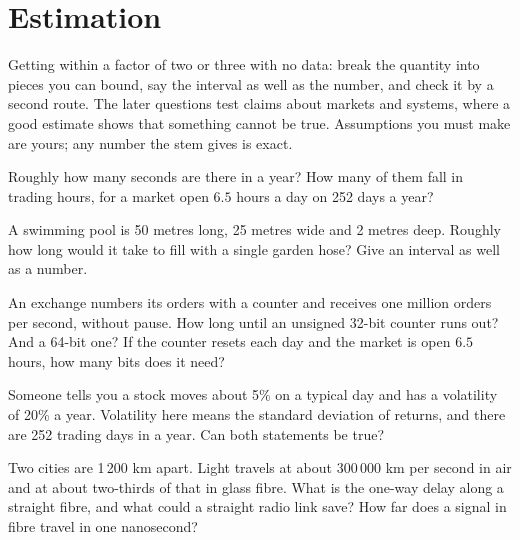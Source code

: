 \chapter{Estimation}\label{ch:iv1:estimation}

\begin{ivtrains}
Getting within a factor of two or three with no data: break the quantity into pieces you can bound, say the interval as well
as the number, and check it by a second route. The later questions test claims about markets and systems, where a good
estimate shows that something cannot be true. Assumptions you must make are yours; any number the stem gives is exact.
\end{ivtrains}

\begin{question}\label{iq:iv1:estimation:1}
Roughly how many seconds are there in a year? How many of them fall in trading hours, for a market open $6.5$ hours a day on 252 days a year?
\end{question}

\begin{question}\label{iq:iv1:estimation:2}
A swimming pool is 50 metres long, 25 metres wide and 2 metres deep. Roughly how long would it take to fill with a single garden hose? Give an interval as well as a number.
\end{question}

\begin{question}\label{iq:iv1:estimation:3}
An exchange numbers its orders with a counter and receives one million orders per second, without pause. How long until an unsigned 32-bit counter runs out? And a 64-bit one? If the counter resets each day and the market is open $6.5$ hours, how many bits does it need?
\end{question}

\begin{question}\label{iq:iv1:estimation:4}
Someone tells you a stock moves about 5\% on a typical day and has a volatility of 20\% a year. Volatility here means the standard deviation of returns, and there are 252 trading days in a year. Can both statements be true?
\end{question}

\begin{question}\label{iq:iv1:estimation:5}
Two cities are 1\,200 km apart. Light travels at about 300\,000 km per second in air and at about two-thirds of that in glass fibre. What is the one-way delay along a straight fibre, and what could a straight radio link save? How far does a signal in fibre travel in one nanosecond?
\end{question}

